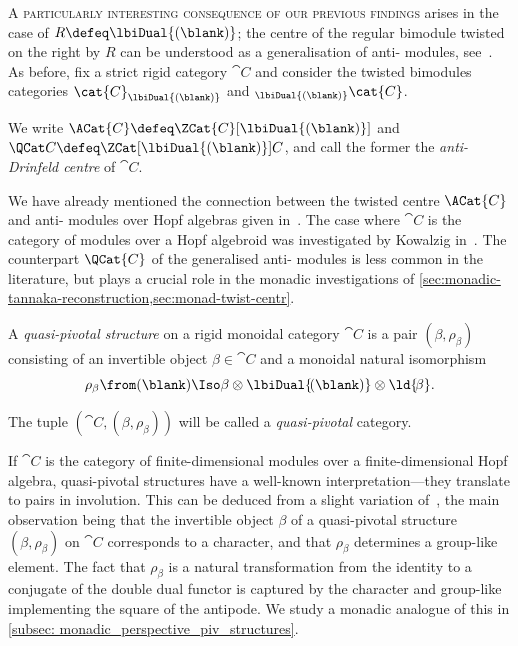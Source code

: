 \textsc{A particularly interesting consequence of our previous findings} arises in the case of \(R \defeq \lbiDual{(\blank)}\);
the centre of the regular bimodule twisted on the right by \(R\) can be understood as a generalisation of anti\hyp{}\YetterDrinfeld{} modules, see~\cite[Theorem~2.3]{Hassanzadeh2019}.
As before, fix a strict rigid category \(\cat{C}\) and consider the twisted bimodules categories
\({\cat{C}}_{\lbiDual{(\blank)}}\) and \({}_{\lbiDual{(\blank)}} {\cat{C}}\).

\begin{notation}\label{not: twisted_centres_with_charge}
  We write \(\ACat{C} \defeq \ZCat{C}[\lbiDual{(\blank)}]\)
  and \(\QCat C \defeq \ZCat[\lbiDual{(\blank)}]{C}\),
  and call the former the \emph{anti\hyp{}Drinfeld centre} of \(\cat{C}\).
\end{notation}

We have already mentioned the connection between the twisted centre \(\ACat{C}\) and anti\hyp{}\YetterDrinfeld{} modules over Hopf algebras given in~\cite{Hassanzadeh2019}.
The case where \(\cat{C}\) is the category of modules over a Hopf algebroid was investigated by Kowalzig in~\cite{kowalzig24:centr}.
The counterpart \(\QCat{C}\) of the generalised anti\hyp{}\YetterDrinfeld{} modules is less common in the literature,
but plays a crucial role in the monadic investigations of \cref{sec:monadic-tannaka-reconstruction,sec:monad-twist-centr}.

\begin{definition}\label{def: quasi_pivotal}
  A \emph{quasi-pivotal structure} on a rigid monoidal category \(\cat{C}\)
  is a pair \((\beta, \rho_{\beta})\) consisting of
  an invertible object \(\beta \in \cat{C}\)
  and a monoidal natural isomorphism
  \[
    \rho_\beta \from (\blank) \Iso \beta \otimes \lbiDual{\!(\blank)} \otimes \ld{\!\beta}.
  \]

  The tuple \((\cat{C}, (\beta, \rho_\beta))\) will be called a \emph{quasi-pivotal} category.
\end{definition}

If \(\cat{C}\) is the category of finite\hyp{}dimensional modules over a finite\hyp{}dimensional Hopf algebra,
quasi-pivotal structures have a well-known interpretation—they translate to pairs in involution.
This can be deduced from a slight variation of~\cite[Lemma~5.6]{Halbig2019},
the main observation being that the invertible object \(\beta\) of a quasi-pivotal structure \((\beta, \rho_\beta)\) on \(\cat{C}\) corresponds to a character,
and that \(\rho_{\beta}\) determines a group-like element.
The fact that \(\rho_\beta\) is a natural transformation from the identity to a conjugate of the double dual functor
is captured by the character and group-like implementing the square of the antipode.
We study a monadic analogue of this in \cref{subsec: monadic_perspective_piv_structures}.

